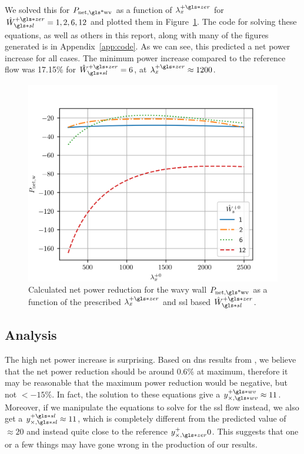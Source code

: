 We solved this for $P_\text{net,\gls*{wv}} $ as a function of $\lambda_x\pz$ for $\hat{W}\ssl\pz=1,2,6,12$ and plotted them in Figure~\ref{fig:pnetww}. The code for solving these equations, as well as others in this report, along with many of the figures generated is in Appendix~\ref{app:code}. As we can see, this predicted a net power increase for all cases. The minimum power increase compared to the reference flow was 17.15\% for $\hat{W}\ssl\pz=6$, at $\lambda_x\pz\approx1200$.
\begin{figure}[htbp]
	\centering
	\includegraphics[width=0.7\linewidth]{project/fig/pnetww.png}
	\caption[Net power reduction for the wavy wall $P_\text{net,w}$]{Calculated net power reduction for the wavy wall $P_\text{net,\gls*{wv}} $ as a function of the prescribed $\lambda_x\pz$ and \gls*{ssl} based $\hat{W}\ssl\pz$.}
	\label{fig:pnetww}
\end{figure}

\subsection{Analysis}
The high net power increase is surprising. Based on \gls*{dns} results from \sgt, we believe that the net power reduction should be around 0.6\% at maximum, therefore it may be reasonable that the maximum power reduction would be negative, but not $<-15\%$. In fact, the solution to these equations give a $y_{\times,\gls*{wv}}\pw\approx 11$. Moreover, if we manipulate the equations to solve for the \gls*{ssl} flow instead, we also get a $y_{\times,\gls*{sl}}\ps\approx11$, which is completely different from the predicted value of $\approx20$ and instead quite close to the reference $y_{\times,\gls*{zer}}\p0$. This suggests that one or a few things may have gone wrong in the production of our results.

